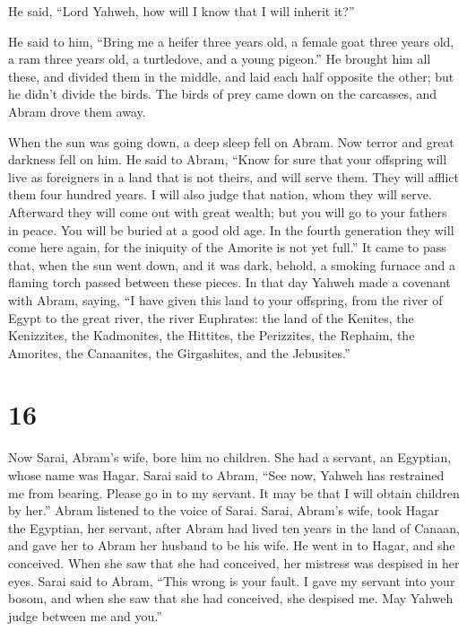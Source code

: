  He said, ``Lord Yahweh, how will I know that I will inherit
it?''

 He said to him, ``Bring me a heifer three years old, a
female goat three years old, a ram three years old, a turtledove, and a
young pigeon.''  He brought him all these, and divided them
in the middle, and laid each half opposite the other; but he didn't
divide the birds.  The birds of prey came down on the
carcasses, and Abram drove them away.

 When the sun was going down, a deep sleep fell on Abram.
Now terror and great darkness fell on him.  He said to
Abram, ``Know for sure that your offspring will live as foreigners in a
land that is not theirs, and will serve them. They will afflict them
four hundred years.  I will also judge that nation, whom
they will serve. Afterward they will come out with great wealth;
 but you will go to your fathers in peace. You will be
buried at a good old age.  In the fourth generation they
will come here again, for the iniquity of the Amorite is not yet full.''
 It came to pass that, when the sun went down, and it was
dark, behold, a smoking furnace and a flaming torch passed between these
pieces.  In that day Yahweh made a covenant with Abram,
saying, ``I have given this land to your offspring, from the river of
Egypt to the great river, the river Euphrates:  the land of
the Kenites, the Kenizzites, the Kadmonites,  the Hittites,
the Perizzites, the Rephaim,  the Amorites, the Canaanites,
the Girgashites, and the Jebusites.''

\hypertarget{section-15}{%
\section{16}\label{section-15}}

 Now Sarai, Abram's wife, bore him no children. She had a
servant, an Egyptian, whose name was Hagar.  Sarai said to
Abram, ``See now, Yahweh has restrained me from bearing. Please go in to
my servant. It may be that I will obtain children by her.'' Abram
listened to the voice of Sarai.  Sarai, Abram's wife, took
Hagar the Egyptian, her servant, after Abram had lived ten years in the
land of Canaan, and gave her to Abram her husband to be his wife.
 He went in to Hagar, and she conceived. When she saw that
she had conceived, her mistress was despised in her eyes. 
Sarai said to Abram, ``This wrong is your fault. I gave my servant into
your bosom, and when she saw that she had conceived, she despised me.
May Yahweh judge between me and you.''

